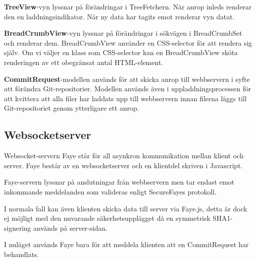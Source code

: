 {\bf TreeView}-vyn lyssnar på förändringar i TreeFetchern. När anrop inleds renderar den en laddningsindikator. När ny data har tagits emot renderar vyn datat.

{\bf BreadCrumbView}-vyn lyssnar på förändringar i sökvägen i BreadCrumbSet och renderar dem. BreadCrumbView använder en CSS-selector för att rendera sig själv. Om vi väljer en klass som CSS-selector kan en BreadCrumbView sköta renderingen av ett obegränsat antal HTML-element.

{\bf CommitRequest}-modellen används för att skicka anrop till webbservern i syfte att förändra Git-repositorier. Modellen används även i uppladdningsprocessen för att kvittera att alla filer har laddats upp till webbservern innan filerna läggs till Git-repositoriet genom ytterligare ett anrop.

\subsection{Websocketserver}
Websocket-servern Faye står för all asynkron kommunikation mellan klient och server. Faye består av en websocketserver och en klientdel skriven i Javascript.

Faye-servern lyssnar på anslutningar från webbservern men tar endast emot inkommande meddelanden som valideras enligt SecureFayes protokoll.

I normala fall kan även klienten skicka data till server via Faye.js, detta är dock ej möjligt med den nuvarande säkerhetsupplägget då en symmetrisk SHA1-signering används på server-sidan.

I nuläget används Faye bara för att meddela klienten att en CommitRequest har behandlats.

